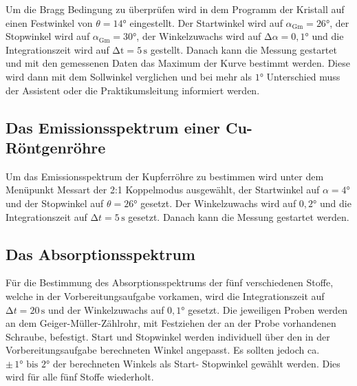 \begin{flushleft}
    Um die Bragg Bedingung zu überprüfen wird in dem Programm der Kristall auf einen Festwinkel von $\theta = 14\unit{\degree}$ eingestellt. 
    Der Startwinkel wird auf $\alpha_{\text{Gm}} = 26\unit{\degree}$, der Stopwinkel wird auf $\alpha_{\text{Gm}} = 30\unit{\degree}$, der Winkelzuwachs wird auf $\increment \alpha = 0,1\unit{\degree}$ und die Integrationszeit wird auf $\increment \text{t} = 5\,\unit{\second}$ gestellt.
    Danach kann die Messung gestartet und mit den gemessenen Daten das Maximum der Kurve bestimmt werden.
    Diese wird dann mit dem Sollwinkel verglichen und bei mehr als $1\unit{\degree}$ Unterschied muss der Assistent oder die Praktikumsleitung informiert werden.
\end{flushleft}

\subsection{Das Emissionsspektrum einer Cu-Röntgenröhre}

\begin{flushleft}
    Um das Emissionsspektrum der Kupferröhre zu bestimmen wird unter dem Menüpunkt Messart der 2:1 Koppelmodus ausgewählt, der Startwinkel auf $\alpha = 4\unit{\degree}$ und der Stopwinkel auf $\theta = 26\unit{\degree}$ gesetzt.
    Der Winkelzuwachs wird auf $0,2\unit{\degree}$ und die Integrationszeit auf $\increment t = 5\,\unit{\second}$ gesetzt.
    Danach kann die Messung gestartet werden.
\end{flushleft}

\subsection{Das Absorptionsspektrum}

\begin{flushleft}
    Für die Bestimmung des Absorptionsspektrums der fünf verschiedenen Stoffe, welche in der Vorbereitungsaufgabe vorkamen, wird die Integrationszeit auf $\increment t = 20\,\unit{\second}$ und der Winkelzuwachs auf $0,1\unit{\degree}$ gesetzt.
    Die jeweiligen Proben werden an dem Geiger-Müller-Zählrohr, mit Festziehen der an der Probe vorhandenen Schraube, befestigt.
    Start und Stopwinkel werden individuell über den in der Vorbereitungsaufgabe berechneten Winkel angepasst.
    Es sollten jedoch ca. $\pm\, 1\unit{\degree}\,\, \text{bis} \,\, 2\unit{\degree}$ der berechneten Winkels als Start- Stopwinkel gewählt werden.
    Dies wird für alle fünf Stoffe wiederholt.
\end{flushleft}